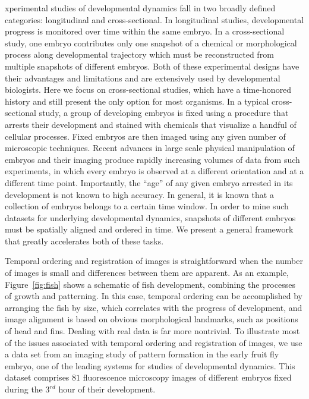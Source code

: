 \documentclass{pnastwo}
\begin{document}
\begin{article}
xperimental studies of developmental dynamics fall in two broadly defined categories: longitudinal and cross-sectional. 
%
In longitudinal studies, developmental progress is monitored over time within the same embryo. 
%
In a cross-sectional study, one embryo contributes only one snapshot of a chemical or morphological process along developmental trajectory which must be reconstructed from multiple snapshots of different embryos. 
%
Both of these experimental designs have their advantages and limitations and are extensively used by developmental biologists. 
%
Here we focus on cross-sectional studies, which have a time-honored history and still present the only option for most organisms. 
%
In a typical cross-sectional study, a group of developing embryos is fixed using a procedure that arrests their development and stained with chemicals that visualize a handful of cellular processes. 
%
Fixed embryos are then imaged using any given number of microscopic techniques. 
%
Recent advances in large scale physical manipulation of embryos and their imaging produce rapidly increasing volumes of data from such experiments, in which every embryo is observed at a different orientation and at a different time point.
%
Importantly, the ``age'' of any given embryo arrested in its development is not known to high accuracy. 
%
In general, it is known that a collection of embryos belongs to a certain time window.
%
In order to mine such datasets for underlying developmental dynamics, snapshots of different embryos must be spatially aligned and ordered in time. 
%
We present a general framework that greatly accelerates both of these tasks.

Temporal ordering and registration of images is straightforward when the number of images is small and differences between them are apparent. 
%
As an example, Figure~\ref{fig:fish} shows a schematic of fish development, combining the processes of growth and patterning.  
%
In this case, temporal ordering can be accomplished by arranging the fish by size, which correlates with the progress of development, and image alignment is based on obvious morphological landmarks, such as positions of head and fins. 
%
Dealing with real data is far more nontrivial. 
%
To illustrate most of the issues associated with temporal ordering and registration of images, we use a data set from an imaging study of pattern formation in the early fruit fly embryo, one of the leading systems for studies of developmental dynamics. 
%
This dataset comprises $81$ fluorescence microscopy images of different embryos fixed during the $3^{rd}$ hour of their development. 


\end{article}
\end{document}
